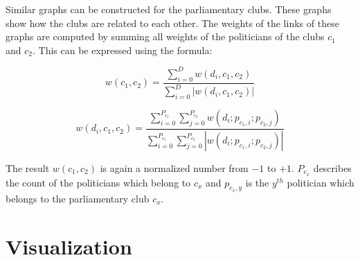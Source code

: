 Similar graphs can be constructed for the parliamentary clubs. These graphs show how the clubs are related to each other. The weights of the links of these graphs are computed by summing all weights of the politicians of the clubs $c_1$ and $c_2$. This can be expressed using the formula:

$$
w(c_1,c_2) = \frac{\displaystyle\sum_{i=0}^{D} w(d_i,c_1,c_2)}{\displaystyle\sum_{i=0}^{D} |w(d_i,c_1,c_2)|}
$$

$$
w(d_i,c_1,c_2) = \frac{\displaystyle\sum_{i=0}^{P_{c_1}} \displaystyle\sum_{j=0}^{P_{c_2}} w(d_i;p_{c_1,i};p_{c_2,j})}{\displaystyle\sum_{i=0}^{P_{c_1}} \displaystyle\sum_{j=0}^{P_{c_2}} |w(d_i;p_{c_1,i};p_{c_2,j})|}
$$

The result $w(c_1,c_2)$ is again a normalized number from $-1$ to $+1$. $P_{c_x}$ describes the count of the politicians which belong to $c_x$ and $p_{c_x,y}$ is the $y^{th}$ politician which belongs to the parliamentary club $c_x$.





\section{Visualization}
\label{sec:visualization}
